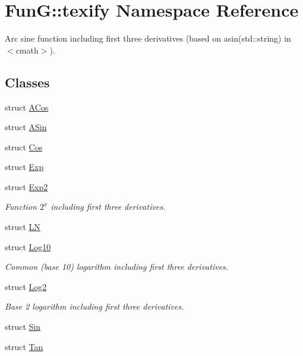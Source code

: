 \hypertarget{namespaceFunG_1_1texify}{\section{Fun\-G\-:\-:texify Namespace Reference}
\label{namespaceFunG_1_1texify}
}


Arc sine function including first three derivatives (based on asin(std\-::string) in $<$cmath$>$).  


\subsection*{Classes}
\begin{DoxyCompactItemize}
\item 
struct \hyperlink{structFunG_1_1texify_1_1ACos}{A\-Cos}
\item 
struct \hyperlink{structFunG_1_1texify_1_1ASin}{A\-Sin}
\item 
struct \hyperlink{structFunG_1_1texify_1_1Cos}{Cos}
\item 
struct \hyperlink{structFunG_1_1texify_1_1Exp}{Exp}
\item 
struct \hyperlink{structFunG_1_1texify_1_1Exp2}{Exp2}
\begin{DoxyCompactList}\small\item\em Function $2^x$ including first three derivatives. \end{DoxyCompactList}\item 
struct \hyperlink{structFunG_1_1texify_1_1LN}{L\-N}
\item 
struct \hyperlink{structFunG_1_1texify_1_1Log10}{Log10}
\begin{DoxyCompactList}\small\item\em Common (base 10) logarithm including first three derivatives. \end{DoxyCompactList}\item 
struct \hyperlink{structFunG_1_1texify_1_1Log2}{Log2}
\begin{DoxyCompactList}\small\item\em Base 2 logarithm including first three derivatives. \end{DoxyCompactList}\item 
struct \hyperlink{structFunG_1_1texify_1_1Sin}{Sin}
\item 
struct \hyperlink{structFunG_1_1texify_1_1Tan}{Tan}
\end{DoxyCompactItemize}
